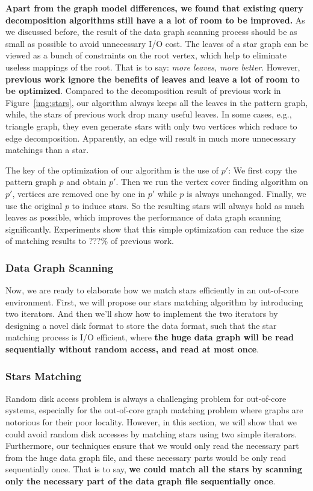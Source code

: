 \textbf{Apart from the graph model differences, we found that existing query decomposition algorithms still have a a lot of room to be improved.}
As we discussed before, the result of the data graph scanning process should be as small as possible to avoid unnecessary I/O cost.
The leaves of a star graph can be viewed as a bunch of constraints on the root vertex,
which help to eliminate useless mappings of the root.
That is to say: \emph{more leaves, more better}.
However, \textbf{previous work ignore the benefits of leaves and leave a lot of room to be optimized}.
Compared to the decomposition result of previous work in Figure~\ref{img:stars},
our algorithm always keeps all the leaves in the pattern graph,
while, the stars of previous work drop many useful leaves.
In some cases, e.g., triangle graph, they even generate stars with only two vertices which reduce to edge decomposition.
Apparently, an edge will result in much more unnecessary matchings than a star.

The key of the optimization of our algorithm is the use of $p'$:
We first copy the pattern graph $p$ and obtain $p'$.
Then we run the vertex cover finding algorithm on $p'$,
vertices are removed one by one in $p'$ while $p$ is always unchanged.
Finally, we use the original $p$ to induce stars.
So the resulting stars will always hold as much leaves as possible,
which improves the performance of data graph scanning significantly.
Experiments show that this simple optimization can reduce the size of matching results to \@???\% of previous work.
\subsubsection{Data Graph Scanning}\label{sec:data_graph_scanning}
Now, we are ready to elaborate how we match stars efficiently in an out-of-core environment.
First, we will propose our stars matching algorithm by introducing two iterators.
And then we'll show how to implement the two iterators by designing a novel disk format to store the data format,
such that the star matching process is I/O efficient, where \textbf{the huge data graph will be read sequentially without random access, and read at most once}.
\subsubsection*{Stars Matching}
Random disk access problem is always a challenging problem for out-of-core systems,
especially for the out-of-core graph matching problem where graphs are notorious for their poor locality.
However, in this section, we will show that we could avoid random disk accesses by matching stars using two simple iterators.
Furthermore, our techniques ensure that we would only read the necessary part from the huge data graph file,
and these necessary parts would be only read sequentially once.
That is to say, \textbf{we could match all the stars by scanning only the necessary part of the data graph file sequentially once}.

